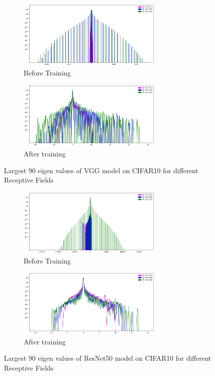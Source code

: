 \begin{figure}[h]
 \centering
     \begin{subfigure}[b]{0.45\textwidth}
    \includegraphics[width=7cm]{images/Hessian_spectre_vgg19_init_cifar10.png}
    \caption{Before Training}
    \label{subfig:Hessian_VGG_before_training}
     \end{subfigure}
      \hfill
     \begin{subfigure}[b]{0.45\textwidth}
    \includegraphics[width=7cm]{images/Hessian_spectre_vgg19_trained_cifar10.png}
    \caption{After training}
    \label{subfig:Hessian_VGG_after_training}
     \end{subfigure}
     \caption{Largest 90 eigen values of VGG model on CIFAR10 for different Receptive Fields  }
    \label{fig:hessian_vgg_cifar10}
\end{figure}




\begin{figure}[h]
 \centering
     \begin{subfigure}[b]{0.45\textwidth}
    \includegraphics[width=7cm]{images/Hessian_spectre_resnet50_init_cifar10.png}
    \caption{Before Training}
    \label{subfig:}
     \end{subfigure}
      \hfill
     \begin{subfigure}[b]{0.45\textwidth}
    \includegraphics[width=7cm]{images/Hessian_spectre_resnet50_trained_cifar10.png}
    \caption{After training}
    \label{subfig:}
     \end{subfigure}
     \caption{Largest 90 eigen values of ResNet50 model on CIFAR10 for different Receptive Fields }
    \label{fig:hessian_resnet50_cifar10}
\end{figure}

